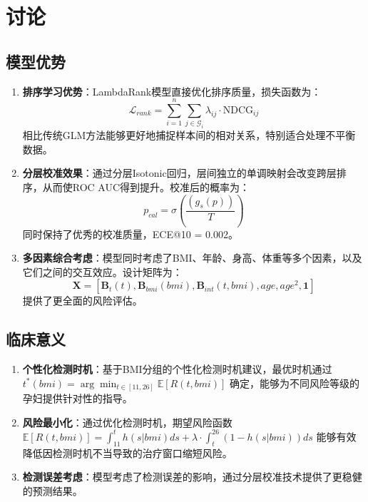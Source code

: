 \documentclass[12pt,a4paper]{ctexart}
\numberwithin{equation}{section}
\theoremstyle{mcm}
\begin{document}







\section{讨论}

\subsection{模型优势}

\begin{enumerate}
\item \textbf{排序学习优势}：LambdaRank模型直接优化排序质量，损失函数为：
   $$\mathcal{L}_{rank} = \sum_{i=1}^n \sum_{j \in \mathcal{G}_i} \lambda_{ij} \cdot \text{NDCG}_{ij}$$
   相比传统GLM方法能够更好地捕捉样本间的相对关系，特别适合处理不平衡数据。

\item \textbf{分层校准效果}：通过分层Isotonic回归，层间独立的单调映射会改变跨层排序，从而使ROC AUC得到提升。校准后的概率为：
   $$p_{cal} = \sigma\left(\frac{(g_s(p))}{T}\right)$$
   同时保持了优秀的校准质量，ECE@10 = 0.002。

\item \textbf{多因素综合考虑}：模型同时考虑了BMI、年龄、身高、体重等多个因素，以及它们之间的交互效应。设计矩阵为：
   $$\mathbf{X} = [\mathbf{B}_t(t), \mathbf{B}_{bmi}(bmi), \mathbf{B}_{int}(t, bmi), age, age^2, \mathbf{1}]$$
   提供了更全面的风险评估。
\end{enumerate}

\subsection{临床意义}

\begin{enumerate}
\item \textbf{个性化检测时机}：基于BMI分组的个性化检测时机建议，最优时机通过 $t^*(bmi) = \arg\min_{t \in [11, 26]} \mathbb{E}[R(t, bmi)]$ 确定，能够为不同风险等级的孕妇提供针对性的指导。

\item \textbf{风险最小化}：通过优化检测时机，期望风险函数 $\mathbb{E}[R(t, bmi)] = \int_{11}^t h(s|bmi) ds + \lambda \cdot \int_t^{26} (1-h(s|bmi)) ds$ 能够有效降低因检测时机不当导致的治疗窗口缩短风险。

\item \textbf{检测误差考虑}：模型考虑了检测误差的影响，通过分层校准技术提供了更稳健的预测结果。
\end{enumerate}
\end{document}
